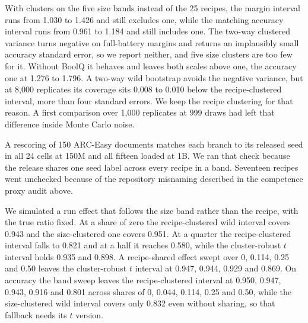 With clusters on the five size bands instead of the 25 recipes, the margin interval runs from 1.030 to 1.426 and still excludes one, while the matching accuracy interval runs from 0.961 to 1.184 and still includes one. The two-way clustered variance turns negative on full-battery margins and returns an implausibly small accuracy standard error, so we report neither, and five size clusters are too few for it. Without BoolQ it behaves and leaves both scales above one, the accuracy one at 1.276 to 1.796. A two-way wild bootstrap avoids the negative variance, but at 8,000 replicates its coverage sits 0.008 to 0.010 below the recipe-clustered interval, more than four standard errors. We keep the recipe clustering for that reason. A first comparison over 1,000 replicates at 999 draws had left that difference inside Monte Carlo noise.

A rescoring of 150 ARC-Easy documents matches each branch to its released seed in all 24 cells at 150M and all fifteen loaded at 1B. We ran that check because the release shares one seed label across every recipe in a band. Seventeen recipes went unchecked because of the repository misnaming described in the competence proxy audit above.

We simulated a run effect that follows the size band rather than the recipe, with the true ratio fixed. At a share of zero the recipe-clustered wild interval covers 0.943 and the size-clustered one covers 0.951. At a quarter the recipe-clustered interval falls to 0.821 and at a half it reaches 0.580, while the cluster-robust $t$ interval holds 0.935 and 0.898. A recipe-shared effect swept over 0, 0.114, 0.25 and 0.50 leaves the cluster-robust $t$ interval at 0.947, 0.944, 0.929 and 0.869. On accuracy the band sweep leaves the recipe-clustered interval at 0.950, 0.947, 0.943, 0.916 and 0.801 across shares of 0, 0.044, 0.114, 0.25 and 0.50, while the size-clustered wild interval covers only 0.832 even without sharing, so that fallback needs its $t$ version.

